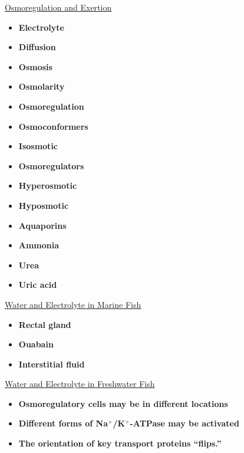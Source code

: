 \documentclass[12pt,letterpaper]{article}
\begin{document}
\hypertarget{40.1}{}
\begin{secbox}{\hyperlink{40}{Osmoregulation and Exertion}}{
    \begin{itemize}
        \item \textbf{Electrolyte}
        \item \textbf{Diffusion}
        \item \textbf{Osmosis}
        \item \textbf{Osmolarity}
        \item \textbf{Osmoregulation }
        \item \textbf{Osmoconformers}
        \item \textbf{Isosmotic}
        \item \textbf{Osmoregulators}
        \item \textbf{Hyperosmotic }
        \item \textbf{Hyposmotic}
        \item \textbf{Aquaporins}
        \item \textbf{Ammonia}
        \item \textbf{Urea}
        \item \textbf{Uric acid}
    \end{itemize}
}\end{secbox}

\hypertarget{40.2}{}
\begin{secbox}{\hyperlink{40}{Water and Electrolyte in Marine Fish}}{
    \begin{itemize}
        \item \textbf{Rectal gland}
        \item \textbf{Ouabain }
        \item \textbf{Interstitial fluid}
    \end{itemize}
}\end{secbox}

\hypertarget{40.3}{}
\begin{secbox}{\hyperlink{40}{Water and Electrolyte in Freshwater Fish}}{
    \begin{itemize}
        \item \textbf{Osmoregulatory cells may be in different locations}
        \item \textbf{Different forms of Na\(^+\)/K\(^+\)-ATPase may be activated}
        \item \textbf{The orientation of key transport proteins “flips.”}
    \end{itemize}
}\end{secbox}
\end{document}

